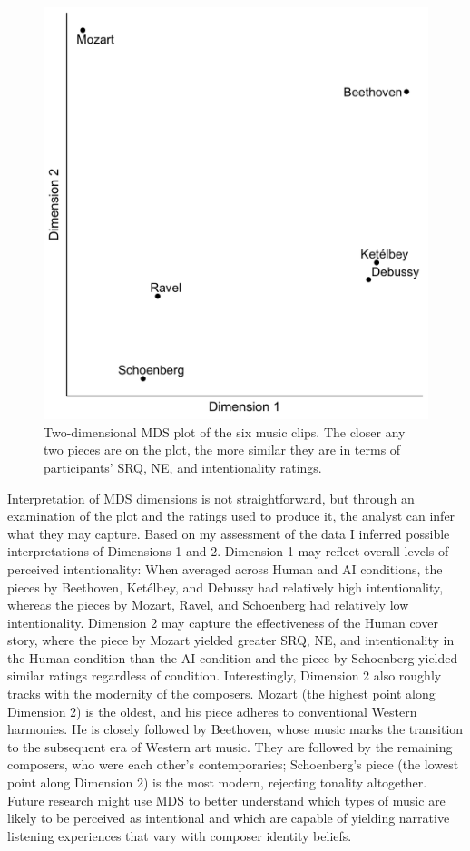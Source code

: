 \documentclass[12pt,twoside]{reedthesis}
\begin{document}
\begin{figure}[h!tbp]
	\centering
	\includegraphics[scale=0.25]{MDS.png}
	\caption{Two-dimensional MDS plot of the six music clips. The closer any two pieces are on the plot, the more similar they are in terms of participants' SRQ, NE, and intentionality ratings.}
	\label{fig-MDS}
\end{figure}

Interpretation of MDS dimensions is not straightforward, but through an examination of the plot and the ratings used to produce it, the analyst can infer what they may capture.  Based on my assessment of the data I inferred possible interpretations of Dimensions 1 and 2. Dimension 1 may reflect overall levels of perceived intentionality: When averaged across Human and AI conditions, the pieces by Beethoven, Ketélbey, and Debussy had relatively high intentionality, whereas the pieces by Mozart, Ravel, and Schoenberg had relatively low intentionality. Dimension 2 may capture the effectiveness of the Human cover story, where the piece by Mozart yielded greater SRQ, NE, and intentionality in the Human condition than the AI condition and the piece by Schoenberg yielded similar ratings regardless of condition. Interestingly, Dimension 2 also roughly tracks with the modernity of the composers. Mozart (the highest point along Dimension 2) is the oldest, and his piece adheres to conventional Western harmonies. He is closely followed by Beethoven, whose music marks the transition to the subsequent era of Western art music. They are followed by the remaining composers, who were each other's contemporaries; Schoenberg's piece (the lowest point along Dimension 2) is the most modern, rejecting tonality altogether. Future research might use MDS to better understand which types of music are likely to be perceived as intentional and which are capable of yielding narrative listening experiences that vary with composer identity beliefs. 
\end{document}
